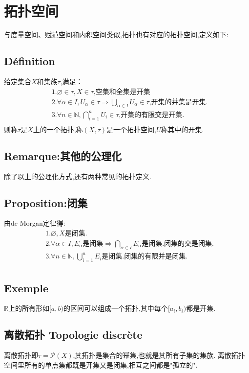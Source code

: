 \documentclass[12pt, a4paper, oneside]{ctexbook}
\newcommand{\R }{\mathbb{R}}%
\begin{document}
\section{拓扑空间}
  与度量空间、赋范空间和内积空间类似,拓扑也有对应的拓扑空间,定义如下:
  \subsection{Définition}
  给定集合$X$和集族$\tau $,满足：
  $$
  \begin{aligned}&
  1.\varnothing\in\tau , X\in\tau\text{,空集和全集是开集}\\&
  2.\forall\alpha\in I,U_\alpha\in\tau \Rightarrow\bigcup_{\alpha\in I}U_\alpha\in\tau \text{,开集的并集是开集.}\\&
  3.\forall n\in\mathbb{N},\bigcap_{i=1}^{n}U_i\in\tau \text{,开集的有限交是开集.}\\
    \end{aligned}
  $$
  则称$\tau $是$X$上的一个拓扑,称$(X,\tau)$是一个拓扑空间,$U$称其中的开集.
  \subsection{Remarque:其他的公理化}
  除了以上的公理化方式,还有两种常见的拓扑定义.
  \subsection{Proposition:闭集}
  由de Morgan定律得:
  $$
  \begin{aligned}&
  1.\varnothing, X{ 是闭集.}\\&
  2.\forall\alpha\in I,E_\alpha\text{是闭集} \Rightarrow\bigcap_{\alpha\in I}E_\alpha \text{是闭集.闭集的交是闭集.}\\&
  3.\forall n\in\mathbb{N},\bigcup_{i=1}^{n}E_i \text{是闭集.闭集的有限并是闭集.}\\
    \end{aligned}
  $$
  \subsection{Exemple}
  $\R$上的所有形如$[a,b)$的区间可以组成一个拓扑,其中每个$[a_i,b_i)$都是开集.

  \subsection{离散拓扑 Topologie discrète}
  离散拓扑即$\tau=\mathcal{P} (X)$,其拓扑是集合的幂集,也就是其所有子集的集族.
  离散拓扑空间里所有的单点集都既是开集又是闭集,相互之间都是"孤立的".
\end{document}

